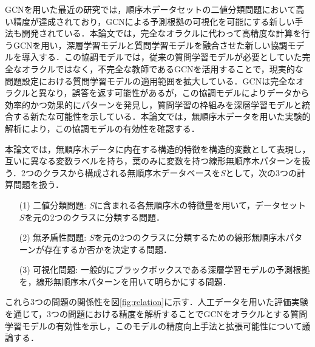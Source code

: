 
GCNを用いた最近の研究では，順序木データセットの二値分類問題において高い精度が達成されており，GCNによる予測根拠の可視化を可能にする新しい手法も開発されている\cite{oda-ai2022}．本論文では，完全なオラクルに代わって高精度な計算を行うGCNを用い，深層学習モデルと質問学習モデルを融合させた新しい協調モデルを導入する．この協調モデルでは，従来の質問学習モデルが必要としていた完全なオラクルではなく，不完全な教師であるGCNを活用することで，現実的な問題設定における質問学習モデルの適用範囲を拡大している．GCNは完全なオラクルと異なり，誤答を返す可能性があるが，この協調モデルによりデータから効率的かつ効果的にパターンを発見し，質問学習の枠組みを深層学習モデルと統合する新たな可能性を示している．本論文では，無順序木データを用いた実験的解析により，この協調モデルの有効性を確認する．

本論文では，無順序木データに内在する構造的特徴を構造的変数として表現し，互いに異なる変数ラベルを持ち，葉のみに変数を持つ線形無順序木パターンを扱う．2つのクラスから構成される無順序木データベースを$S$として，次の3つの計算問題を扱う．
\begin{enumerate}
  \item[(1)] 二値分類問題: $S$に含まれる各無順序木の特徴量を用いて，データセット$S$を元の2つのクラスに分類する問題．
  \item[(2)] 無矛盾性問題: $S$を元の2つのクラスに分類するための線形無順序木パターンが存在するか否かを決定する問題．
  \item[(3)] 可視化問題: 一般的にブラックボックスである深層学習モデルの予測根拠を，線形無順序木パターンを用いて明らかにする問題．
\end{enumerate}
これら3つの問題の関係性を図\ref{fig:relation}に示す．人工データを用いた評価実験を通じて，3つの問題における精度を解析することでGCNをオラクルとする質問学習モデルの有効性を示し，このモデルの精度向上手法と拡張可能性について議論する．

